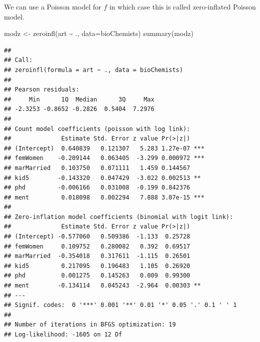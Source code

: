 \documentclass[
  ignorenonframetext,
]{beamer}
\newenvironment{Shaded}{\begin{snugshade}}{\end{snugshade}}
\newcommand{\AttributeTok}[1]{\textcolor[rgb]{0.77,0.63,0.00}{#1}}
\newcommand{\FunctionTok}[1]{\textcolor[rgb]{0.00,0.00,0.00}{#1}}
\newcommand{\NormalTok}[1]{#1}
\newcommand{\OtherTok}[1]{\textcolor[rgb]{0.56,0.35,0.01}{#1}}
\newcommand{\SpecialCharTok}[1]{\textcolor[rgb]{0.00,0.00,0.00}{#1}}
\begin{document}
\begin{frame}[fragile]{}
\protect\hypertarget{section-34}{}
We can use a Poisson model for \(f\) in which case this is called
zero-inflated Poisson model.

\vspace{12pt}
\tiny

\begin{Shaded}
\begin{Highlighting}[]
\NormalTok{modz }\OtherTok{\textless{}{-}} \FunctionTok{zeroinfl}\NormalTok{(art }\SpecialCharTok{\textasciitilde{}}\NormalTok{ ., }\AttributeTok{data=}\NormalTok{bioChemists)}
\FunctionTok{summary}\NormalTok{(modz)}
\end{Highlighting}
\end{Shaded}

\begin{verbatim}
## 
## Call:
## zeroinfl(formula = art ~ ., data = bioChemists)
## 
## Pearson residuals:
##     Min      1Q  Median      3Q     Max 
## -2.3253 -0.8652 -0.2826  0.5404  7.2976 
## 
## Count model coefficients (poisson with log link):
##              Estimate Std. Error z value Pr(>|z|)    
## (Intercept)  0.640839   0.121307   5.283 1.27e-07 ***
## femWomen    -0.209144   0.063405  -3.299 0.000972 ***
## marMarried   0.103750   0.071111   1.459 0.144567    
## kid5        -0.143320   0.047429  -3.022 0.002513 ** 
## phd         -0.006166   0.031008  -0.199 0.842376    
## ment         0.018098   0.002294   7.888 3.07e-15 ***
## 
## Zero-inflation model coefficients (binomial with logit link):
##              Estimate Std. Error z value Pr(>|z|)   
## (Intercept) -0.577060   0.509386  -1.133  0.25728   
## femWomen     0.109752   0.280082   0.392  0.69517   
## marMarried  -0.354018   0.317611  -1.115  0.26501   
## kid5         0.217095   0.196483   1.105  0.26920   
## phd          0.001275   0.145263   0.009  0.99300   
## ment        -0.134114   0.045243  -2.964  0.00303 **
## ---
## Signif. codes:  0 '***' 0.001 '**' 0.01 '*' 0.05 '.' 0.1 ' ' 1 
## 
## Number of iterations in BFGS optimization: 19 
## Log-likelihood: -1605 on 12 Df
\end{verbatim}
\end{frame}
\end{document}
